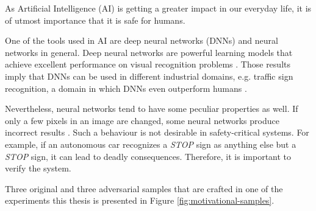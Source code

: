 As Artificial Intelligence (AI) is getting a greater impact in our everyday life, it is of utmost importance that it is safe for humans.  

One of the tools used in AI are deep neural networks (DNNs) and neural networks in general. Deep neural networks are powerful learning models that achieve excellent performance on visual recognition problems \cite{krizhevsky2012imagenet}. Those results imply that DNNs can be used in different industrial domains, e.g. traffic sign recognition, a domain in which DNNs even outperform humans \cite{outperformhumans}. 

Nevertheless, neural networks tend to have some peculiar properties as well. If only a few pixels in an image are changed, some neural networks produce incorrect results \cite{szegedy2013intriguing}. Such a behaviour is not desirable in safety-critical systems. For example, if an autonomous car recognizes a  \textit{STOP} sign as anything else but a \textit{STOP} sign, it can lead to deadly consequences. Therefore, it is important to verify the system. 

Three original and three adversarial samples that are crafted in one of the experiments this thesis is presented in Figure \ref{fig:motivational-samples}.


